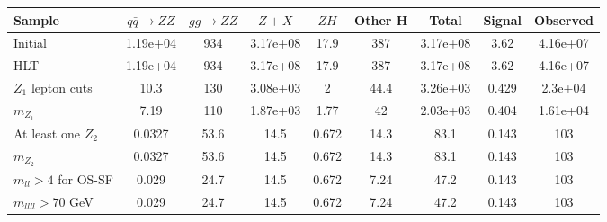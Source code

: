 \begin{table*}[htbH]    
\begin{center}    
\label{tab:yields}    
\begin{tabular}{ l | c | c | c | c | c | c | c | c }     
\hline    
\hline    
Sample & $q\bar{q} \rightarrow ZZ$ & $gg \rightarrow ZZ$ & $Z+X$ & $ZH$ & Other H & Total & Signal & Observed \\ 
\hline 
Initial & 1.19e+04 & 934 & 3.17e+08 & 17.9 & 387 & 3.17e+08 & 3.62 & 4.16e+07 \\ 
\hline 
HLT & 1.19e+04 & 934 & 3.17e+08 & 17.9 & 387 & 3.17e+08 & 3.62 & 4.16e+07 \\ 
\hline 
$Z_1$ lepton cuts & 10.3 & 130 & 3.08e+03 & 2 & 44.4 & 3.26e+03 & 0.429 & 2.3e+04 \\ 
\hline 
$m_{Z_1}$ & 7.19 & 110 & 1.87e+03 & 1.77 & 42 & 2.03e+03 & 0.404 & 1.61e+04 \\ 
\hline 
At least one $Z_2$ & 0.0327 & 53.6 & 14.5 & 0.672 & 14.3 & 83.1 & 0.143 & 103 \\ 
\hline 
$m_{Z_2}$ & 0.0327 & 53.6 & 14.5 & 0.672 & 14.3 & 83.1 & 0.143 & 103 \\ 
\hline 
$m_{ll}>4$ for OS-SF & 0.029 & 24.7 & 14.5 & 0.672 & 7.24 & 47.2 & 0.143 & 103 \\ 
\hline 
$m_{llll} > 70$ GeV & 0.029 & 24.7 & 14.5 & 0.672 & 7.24 & 47.2 & 0.143 & 103 \\ 
\hline 
\hline    
\end{tabular}    
\end{center}    
\end{table*} 

